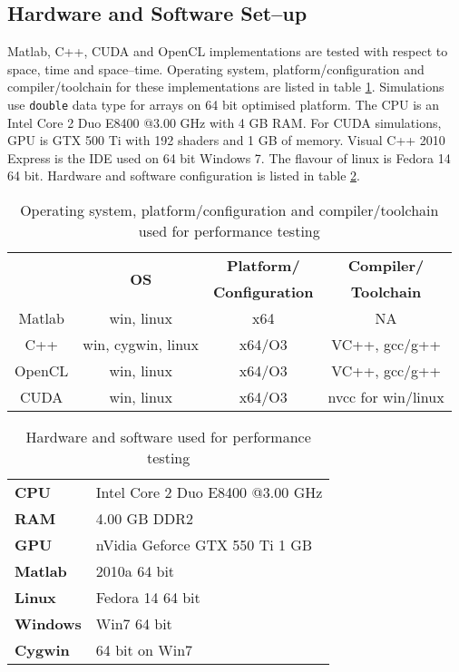 \subsection{Hardware and Software Set--up}
Matlab, C++, CUDA and OpenCL implementations are tested with respect to space, time and space--time. Operating system, platform/configuration and compiler/toolchain for these implementations are listed in table \ref{Tab:OS-Platform/Configuration-Compiler/Toolchain-for-Testing}. Simulations use \verb|double| data type for arrays on 64 bit optimised platform. The CPU is an Intel Core 2 Duo E8400 @3.00 GHz with 4 GB RAM. For CUDA simulations, GPU is GTX 500 Ti with 192 shaders and 1 GB of memory. Visual C++ 2010 Express is the IDE used on 64 bit Windows 7. The flavour of linux is Fedora 14 64 bit. Hardware and software configuration is listed in table \ref{Tab:Hardware-Software-Configuration-for-Testing}.
\begin{table}[H]
\begin{center}
\vspace{0.3cm}
	\begin{tabular}{cccc}
	\hline \hline
		\rule{0pt}{2.6ex} \multirow{2}{*}{\textbf{API}} & \multirow{2}{*}{\textbf{OS}} & \textbf{Platform/} & \textbf{Compiler/}\\
		& & \textbf{Configuration} & \textbf{Toolchain}\\
		\hline
		Matlab \rule{0pt}{2.6ex} & win, linux & x64 & NA\\
		C++ & win, cygwin, linux & x64/O3 & VC++, gcc/g++\\
		OpenCL & win, linux & x64/O3 & VC++, gcc/g++\\
		CUDA & win, linux & x64/O3 & nvcc for win/linux\\
	\hline \hline
	\end{tabular}
\end{center}
\caption{Operating system, platform/configuration and compiler/toolchain used for performance testing}
\label{Tab:OS-Platform/Configuration-Compiler/Toolchain-for-Testing}
\end{table}
\begin{table}[H]
\begin{center}
\vspace{0.3cm}
	\begin{tabular}{ll}
	\hline \hline
		\textbf{CPU} \rule{0pt}{2.6ex}& Intel Core 2 Duo E8400 @3.00 GHz\\
		\textbf{RAM} & 4.00 GB DDR2\\
		\textbf{GPU} & nVidia Geforce GTX 550 Ti 1 GB\\
		\textbf{Matlab} & 2010a 64 bit\\
		\textbf{Linux} & Fedora 14 64 bit\\
		\textbf{Windows} & Win7 64 bit\\
		\textbf{Cygwin} & 64 bit on Win7\\
	\hline \hline
	\end{tabular}
\end{center}
\caption{Hardware and software used for performance testing}
\label{Tab:Hardware-Software-Configuration-for-Testing}
\end{table}

